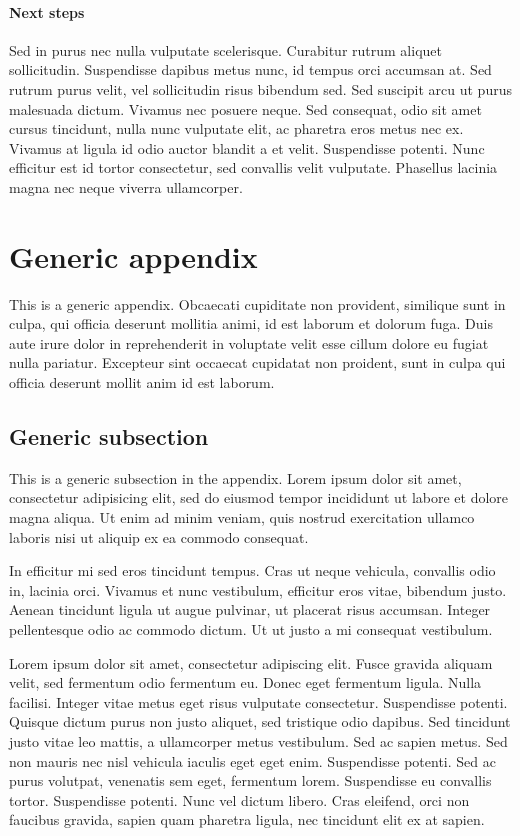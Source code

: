 \documentclass[letterpaper,11pt,leqno]{article}
\newcommand{\bib}{bibliography.bib}
\begin{document}
\paragraph{Next steps} Sed in purus nec nulla vulputate scelerisque. Curabitur rutrum aliquet sollicitudin. Suspendisse dapibus metus nunc, id tempus orci accumsan at. Sed rutrum purus velit, vel sollicitudin risus bibendum sed. Sed suscipit arcu ut purus malesuada dictum. Vivamus nec posuere neque. Sed consequat, odio sit amet cursus tincidunt, nulla nunc vulputate elit, ac pharetra eros metus nec ex. Vivamus at ligula id odio auctor blandit a et velit. Suspendisse potenti. Nunc efficitur est id tortor consectetur, sed convallis velit vulputate. Phasellus lacinia magna nec neque viverra ullamcorper.


\appendix

\section{Generic appendix}\label{a:appendix1}

This is a generic appendix. Obcaecati cupiditate non provident, similique sunt in culpa, qui officia deserunt mollitia animi, id est laborum et dolorum fuga. Duis aute irure dolor in reprehenderit in voluptate velit esse cillum dolore eu fugiat nulla pariatur. Excepteur sint occaecat cupidatat non proident, sunt in culpa qui officia deserunt mollit anim id est laborum. 

\subsection{Generic subsection} 

This is a generic subsection in the appendix. Lorem ipsum dolor sit amet, consectetur adipisicing elit, sed do eiusmod tempor incididunt ut labore et dolore magna aliqua. Ut enim ad minim veniam, quis nostrud exercitation ullamco laboris nisi ut aliquip ex ea commodo consequat. 

In efficitur mi sed eros tincidunt tempus. Cras ut neque vehicula, convallis odio in, lacinia orci. Vivamus et nunc vestibulum, efficitur eros vitae, bibendum justo. Aenean tincidunt ligula ut augue pulvinar, ut placerat risus accumsan. Integer pellentesque odio ac commodo dictum. Ut ut justo a mi consequat vestibulum. 

Lorem ipsum dolor sit amet, consectetur adipiscing elit. Fusce gravida aliquam velit, sed fermentum odio fermentum eu. Donec eget fermentum ligula. Nulla facilisi. Integer vitae metus eget risus vulputate consectetur. Suspendisse potenti. Quisque dictum purus non justo aliquet, sed tristique odio dapibus. Sed tincidunt justo vitae leo mattis, a ullamcorper metus vestibulum. Sed ac sapien metus. Sed non mauris nec nisl vehicula iaculis eget eget enim. Suspendisse potenti. Sed ac purus volutpat, venenatis sem eget, fermentum lorem. Suspendisse eu convallis tortor. Suspendisse potenti. Nunc vel dictum libero. Cras eleifend, orci non faucibus gravida, sapien quam pharetra ligula, nec tincidunt elit ex at sapien. 
\end{document}
